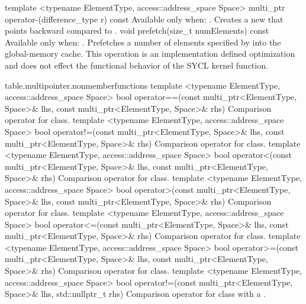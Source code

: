 \addRowTwoL
{template <typename ElementType, access::address_space Space>}
{multi_ptr operator-(difference_type r) const}
{Available only when: .
\newline
Creates a new  that points  backward
compared to .}
  \addRow
    { void prefetch(size_t numElements) const }
    {
      Available only when: .
      \newline
      Prefetches a number of elements specified by  into
      the \gls{global-memory} cache. This operation is an implementation defined
      optimization and does not effect the functional  behavior of the SYCL
      kernel function.
    }
\completeTable

{table.multipointer.nonmemberfunctions}
\addRowThreeL
{template <typename ElementType, access::address_space Space>}
{bool operator==(const multi_ptr<ElementType, Space>\& lhs,}
{                const multi_ptr<ElementType, Space>\& rhs)}
{Comparison operator \codeinline{==} for  class.}
\addRowThreeL
{template <typename ElementType, access::address_space Space>}
{bool operator!=(const multi_ptr<ElementType, Space>\& lhs,}
{                const multi_ptr<ElementType, Space>\& rhs)}
{Comparison operator \codeinline{!=} for  class.}
\addRowThreeL
{template <typename ElementType, access::address_space Space>}
{bool operator<(const multi_ptr<ElementType, Space>\& lhs,}
{               const multi_ptr<ElementType, Space>\& rhs)}
{Comparison operator \codeinline{<} for  class.}
\addRowThreeL
{template <typename ElementType, access::address_space Space>}
{bool operator>(const multi_ptr<ElementType, Space>\& lhs,}
               {const multi_ptr<ElementType, Space>\& rhs)}
{Comparison operator \codeinline{>} for  class.}
\addRowThreeL
{template <typename ElementType, access::address_space Space>}
{bool operator<=(const multi_ptr<ElementType, Space>\& lhs,}
{                const multi_ptr<ElementType, Space>\& rhs)}
{Comparison operator \codeinline{<=} for  class.}
\addRowThreeL
{template <typename ElementType, access::address_space Space>}
{bool operator>=(const multi_ptr<ElementType, Space>\& lhs,}
                {const multi_ptr<ElementType, Space>\& rhs)}
{Comparison operator \codeinline{>=} for  class.}
\addRowTwoL
{template <typename ElementType, access::address_space Space>}
{bool operator!=(const multi_ptr<ElementType, Space>\& lhs, std::nullptr_t rhs)}
{Comparison operator \codeinline{!=} for  class with a
.}

